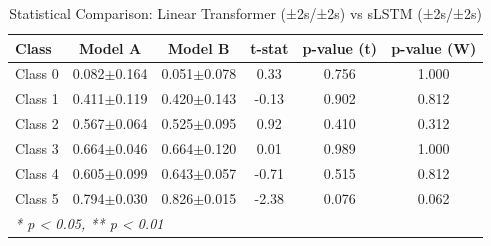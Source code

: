 \begin{table}[htbp]
\centering
\caption{Statistical Comparison: Linear Transformer (±2s/±2s) vs sLSTM (±2s/±2s)}
\label{tab:comparison_class_linear_transformer_±2s_±2s_vs_slstm_±2s_±2s}
\begin{tabular}{lccccc}
\toprule
\textbf{Class} & \textbf{Model A} & \textbf{Model B} & \textbf{t-stat} & \textbf{p-value (t)} & \textbf{p-value (W)} \\
\midrule
Class 0 & 0.082$\pm$0.164 & 0.051$\pm$0.078 & 0.33 & 0.756 & 1.000 \\
Class 1 & 0.411$\pm$0.119 & 0.420$\pm$0.143 & -0.13 & 0.902 & 0.812 \\
Class 2 & 0.567$\pm$0.064 & 0.525$\pm$0.095 & 0.92 & 0.410 & 0.312 \\
Class 3 & 0.664$\pm$0.046 & 0.664$\pm$0.120 & 0.01 & 0.989 & 1.000 \\
Class 4 & 0.605$\pm$0.099 & 0.643$\pm$0.057 & -0.71 & 0.515 & 0.812 \\
Class 5 & 0.794$\pm$0.030 & 0.826$\pm$0.015 & -2.38 & 0.076 & 0.062 \\
\bottomrule
\multicolumn{6}{l}{\textit{* p < 0.05, ** p < 0.01}} \\
\end{tabular}
\end{table}